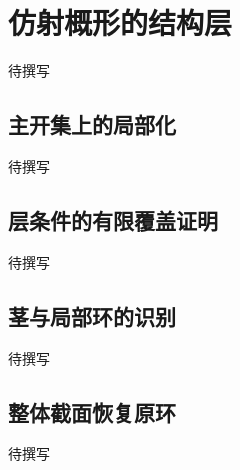 
% 
% 

\section{仿射概形的结构层}
\label{g5:sec:1002}

待撰写

\subsection{主开集上的局部化}
\label{g5:subsec:1002:01}
待撰写

\subsection{层条件的有限覆盖证明}
\label{g5:subsec:1002:02}
待撰写

\subsection{茎与局部环的识别}
\label{g5:subsec:1002:03}
待撰写

\subsection{整体截面恢复原环}
\label{g5:subsec:1002:04}
待撰写
